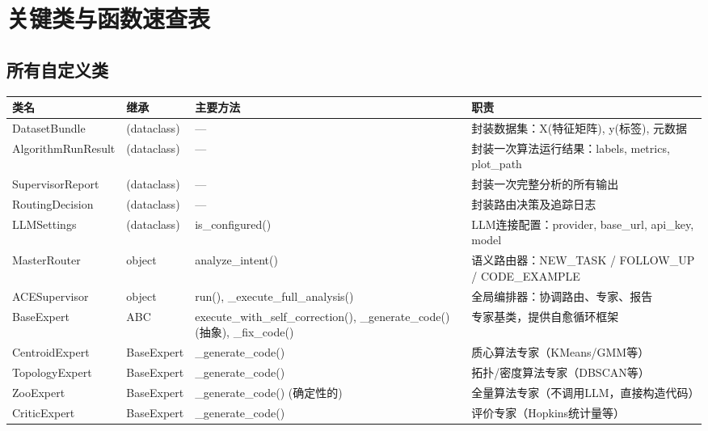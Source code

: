 \documentclass[11pt,a4paper]{ctexbook}
\begin{document}
\chapter{关键类与函数速查表}

\section{所有自定义类}

\begin{longtable}{p{2.8cm} p{2cm} p{2.5cm} p{5.5cm}}
    \toprule
    \textbf{类名} & \textbf{继承} & \textbf{主要方法} & \textbf{职责} \\
    \midrule
    DatasetBundle & (dataclass) & — & 封装数据集：X(特征矩阵), y(标签), 元数据 \\
    \midrule
    AlgorithmRunResult & (dataclass) & — & 封装一次算法运行结果：labels, metrics, plot\_path \\
    \midrule
    SupervisorReport & (dataclass) & — & 封装一次完整分析的所有输出 \\
    \midrule
    RoutingDecision & (dataclass) & — & 封装路由决策及追踪日志 \\
    \midrule
    LLMSettings & (dataclass) & is\_configured() & LLM连接配置：provider, base\_url, api\_key, model \\
    \midrule
    MasterRouter & object & analyze\_intent() & 语义路由器：NEW\_TASK / FOLLOW\_UP / CODE\_EXAMPLE \\
    \midrule
    ACESupervisor & object & run(), \_execute\_full\_analysis() & 全局编排器：协调路由、专家、报告 \\
    \midrule
    BaseExpert & ABC & execute\_with\_self\_correction(), \_generate\_code() (抽象), \_fix\_code() & 专家基类，提供自愈循环框架 \\
    \midrule
    CentroidExpert & BaseExpert & \_generate\_code() & 质心算法专家（KMeans/GMM等） \\
    \midrule
    TopologyExpert & BaseExpert & \_generate\_code() & 拓扑/密度算法专家（DBSCAN等） \\
    \midrule
    ZooExpert & BaseExpert & \_generate\_code() (确定性的) & 全量算法专家（不调用LLM，直接构造代码） \\
    \midrule
    CriticExpert & BaseExpert & \_generate\_code() & 评价专家（Hopkins统计量等） \\

\end{longtable}
\end{document}
